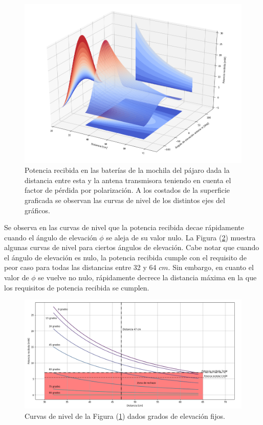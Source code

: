 \begin{figure}[H]
	\centering
	\includegraphics[width=\linewidth]{ImagenesFactibilidad/antenas_potrecibida}
	\caption{Potencia recibida en las baterías de la mochila del pájaro dada la distancia entre esta y la antena transmisora teniendo en cuenta el factor de pérdida por polarización. A los costados de la superficie graficada se observan las curvas de nivel de los distintos ejes del gráficos.}
	\label{fig:antenas_potrecibida}
\end{figure}

Se observa en las curvas de nivel que la potencia recibida decae rápidamente cuando el ángulo de elevación $\phi$ se aleja de su valor nulo. La Figura (\ref{fig:antenas_curva_distancia}) muestra algunas curvas de nivel para ciertos ángulos de elevación. Cabe notar que cuando el ángulo de elevación es nulo, la potencia recibida cumple con el requisito de peor caso para todas las distancias entre 32 y 64 $cm$. Sin embargo, en cuanto el valor de $\phi$ se vuelve no nulo, rápidamente decrece la distancia máxima en la que los requisitos de potencia recibida se cumplen.

\begin{figure}[H]
	\centering
	\includegraphics[width=\linewidth]{ImagenesFactibilidad/antenas_curva_distancia}
	\caption{Curvas de nivel de la Figura (\ref{fig:antenas_potrecibida}) dados grados de elevación fijos.}
	\label{fig:antenas_curva_distancia}
\end{figure}


